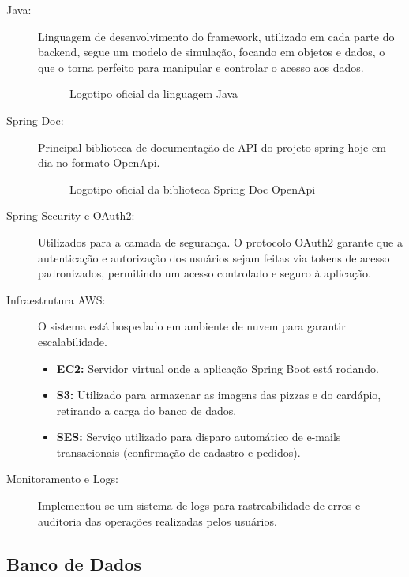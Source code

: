 \documentclass[12pt, a4paper]{article}
\begin{document}
\begin{description}
    \item[Java:] Linguagem de desenvolvimento do framework, utilizado em cada parte do backend, segue um modelo de simulação, focando em objetos e dados, o que o torna perfeito para manipular e controlar o acesso aos dados.
    
    \begin{figure}[H]
        \centering
        \caption{Logotipo oficial da linguagem Java}
        \label{fig:logo}
    \end{figure}

    \item[Spring Doc:] Principal biblioteca de documentação de API do projeto spring hoje em dia no formato OpenApi.
        
    \begin{figure}[H]
        \centering
        \caption{Logotipo oficial da biblioteca Spring Doc OpenApi}
        \label{fig:logo}
    \end{figure}
    
    \item[Spring Security e OAuth2:] Utilizados para a camada de segurança. O protocolo OAuth2 garante que a autenticação e autorização dos usuários sejam feitas via tokens de acesso padronizados, permitindo um acesso controlado e seguro à aplicação.
    
    \item[Infraestrutura {AWS}:] O sistema está hospedado em ambiente de nuvem para garantir escalabilidade.
    \begin{itemize}
        \item \textbf{EC2:} Servidor virtual onde a aplicação Spring Boot está rodando.
        \item \textbf{S3:} Utilizado para armazenar as imagens das pizzas e do cardápio, retirando a carga do banco de dados.
        \item \textbf{SES:} Serviço utilizado para disparo automático de e-mails transacionais (confirmação de cadastro e pedidos).
    \end{itemize}
    
    \item[Monitoramento e Logs:] Implementou-se um sistema de logs para rastreabilidade de erros e auditoria das operações realizadas pelos usuários.
\end{description}

\subsection{Banco de Dados}
\end{document}
